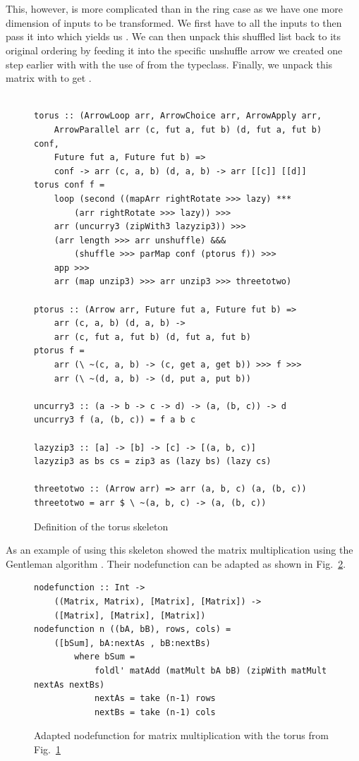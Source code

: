 \\\\
This, however, is more complicated than in the ring case as we have one more dimension of inputs to be transformed. We first have to  all the inputs to then pass it into  which yields us . We can then unpack this shuffled list back to its original ordering by feeding it into the specific unshuffle arrow we created one step earlier with  with the use of  from the  typeclass. Finally, we unpack this matrix \code{[[[(d, fut a, fut b)]]} with  to get  \code{([[d]], ([[fut a]], [[fut b]]))}.
\\\\
\begin{figure}[h]
\begin{lstlisting}[frame=htrbl]
torus :: (ArrowLoop arr, ArrowChoice arr, ArrowApply arr,
	ArrowParallel arr (c, fut a, fut b) (d, fut a, fut b) conf,
	Future fut a, Future fut b) =>
	conf -> arr (c, a, b) (d, a, b) -> arr [[c]] [[d]]
torus conf f =
	loop (second ((mapArr rightRotate >>> lazy) ***
		(arr rightRotate >>> lazy)) >>>
	arr (uncurry3 (zipWith3 lazyzip3)) >>>
	(arr length >>> arr unshuffle) &&&
		(shuffle >>> parMap conf (ptorus f)) >>>
	app >>>
	arr (map unzip3) >>> arr unzip3 >>> threetotwo)

ptorus :: (Arrow arr, Future fut a, Future fut b) =>
	arr (c, a, b) (d, a, b) ->
	arr (c, fut a, fut b) (d, fut a, fut b)
ptorus f =
	arr (\ ~(c, a, b) -> (c, get a, get b)) >>> f >>>
	arr (\ ~(d, a, b) -> (d, put a, put b))

uncurry3 :: (a -> b -> c -> d) -> (a, (b, c)) -> d
uncurry3 f (a, (b, c)) = f a b c

lazyzip3 :: [a] -> [b] -> [c] -> [(a, b, c)]
lazyzip3 as bs cs = zip3 as (lazy bs) (lazy cs)

threetotwo :: (Arrow arr) => arr (a, b, c) (a, (b, c))
threetotwo = arr $ \ ~(a, b, c) -> (a, (b, c))
\end{lstlisting}
\caption{Definition of the torus skeleton}
\label{fig:torus}
\end{figure}
As an example of using this skeleton \citep{Loogen2012} showed the matrix multiplication using the Gentleman algorithm \citep{Gentleman1978}. Their nodefunction can be adapted as shown in Fig.~\ref{fig:torusMatMult}.
\begin{figure}[h]
\begin{lstlisting}[frame=htrbl]
nodefunction :: Int ->
	((Matrix, Matrix), [Matrix], [Matrix]) ->
	([Matrix], [Matrix], [Matrix])
nodefunction n ((bA, bB), rows, cols) =
	([bSum], bA:nextAs , bB:nextBs)
		where bSum =
			foldl' matAdd (matMult bA bB) (zipWith matMult nextAs nextBs)
			nextAs = take (n-1) rows
			nextBs = take (n-1) cols
\end{lstlisting}
\caption{Adapted nodefunction for matrix multiplication with the torus from Fig.~\ref{fig:torus}}
\label{fig:torusMatMult}
\end{figure}
